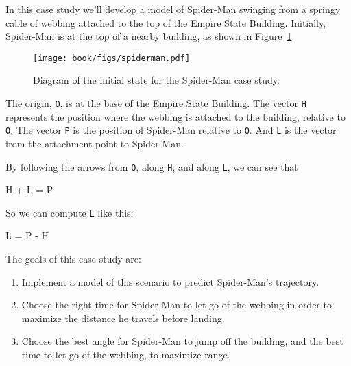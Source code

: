 \documentclass[main.tex]{subfiles}
\begin{document}
In this case study we'll develop a model of Spider-Man swinging from a
springy cable of webbing attached to the top of the Empire State
Building.  Initially, Spider-Man is at the top of a nearby building, as
shown in Figure~\ref{spiderman}.


\begin{figure}
\centerline{\texttt{[image: book/figs/spiderman.pdf]}}
\caption{Diagram of the initial state for the Spider-Man case study.}
\label{spiderman}
\end{figure}

The origin, {\tt O}, is at the base of the Empire State Building. The
vector {\tt H} represents the position where the webbing is attached
to the building, relative to {\tt O}. The vector {\tt P} is the
position of Spider-Man relative to {\tt O}. And {\tt L} is the
vector from the attachment point to Spider-Man.


By following the arrows from {\tt O}, along {\tt H}, and along
{\tt L}, we can see that

\begin{code}
H + L = P
\end{code}

So we can compute {\tt L} like this:

\begin{code}
L = P - H
\end{code}

The goals of this case study are:

\begin{enumerate}

\item
  Implement a model of this scenario to predict Spider-Man's trajectory.


\item
  Choose the right time for Spider-Man to let go of the webbing in order
  to maximize the distance he travels before landing.


\item
  Choose the best angle for Spider-Man to jump off the building, and the best time to let go of the webbing, to maximize range.

  
\end{enumerate}
\end{document}
